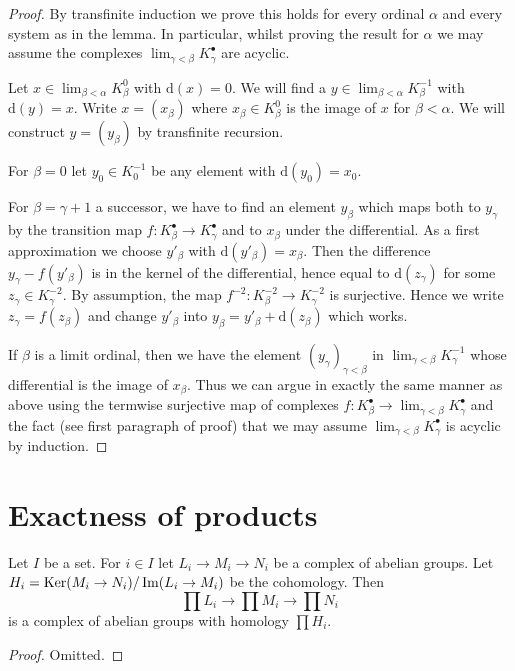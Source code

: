 \begin{proof}
By transfinite induction we prove this holds for every ordinal
$\alpha$ and every system as in the lemma. In particular, whilst
proving the result for $\alpha$ we may assume the complexes
$\lim_{\gamma < \beta} K^\bullet_\gamma$ are acyclic.

\medskip\noindent
Let $x \in \lim_{\beta < \alpha} K^0_\beta$ with $\text{d}(x) = 0$.
We will find a $y \in \lim_{\beta < \alpha} K^{-1}_\beta$
with $\text{d}(y) = x$.
Write $x = (x_\beta)$ where $x_\beta \in K_\beta^0$ is the
image of $x$ for $\beta < \alpha$. We will construct $y = (y_\beta)$
by transfinite recursion.

\medskip\noindent
For $\beta = 0$ let $y_0 \in K_0^{-1}$
be any element with $\text{d}(y_0) = x_0$.

\medskip\noindent
For $\beta = \gamma + 1$ a successor, we have to find an element $y_\beta$
which maps both to $y_\gamma$ by the transition map
$f : K^\bullet_\beta \to K^\bullet_\gamma$ and to $x_\beta$ under the
differential. As a first approximation we choose $y'_\beta$ with
$\text{d}(y'_\beta) = x_\beta$. Then the difference $y_\gamma - f(y'_\beta)$
is in the kernel of the differential, hence equal to $\text{d}(z_\gamma)$
for some $z_\gamma \in K^{-2}_\gamma$.
By assumption, the map $f^{-2} : K^{-2}_\beta \to K^{-2}_\gamma$
is surjective. Hence we write $z_\gamma = f(z_\beta)$
and change $y'_\beta$ into $y_\beta = y'_\beta + \text{d}(z_\beta)$
which works.

\medskip\noindent
If $\beta$ is a limit ordinal, then we have the element
$(y_\gamma)_{\gamma < \beta}$ in $\lim_{\gamma < \beta} K^{-1}_\gamma$
whose differential is the image of $x_\beta$. Thus we can argue in exactly
the same manner as above using the termwise surjective map of complexes
$f : K_\beta^\bullet \to \lim_{\gamma < \beta} K_\gamma^\bullet$
and the fact (see first paragraph of proof) that we may assume
$\lim_{\gamma < \beta} K_\gamma^\bullet$ is acyclic by induction.
\end{proof}


\section{Exactness of products}
\label{section-product-exact}


\begin{lemma}
\label{lemma-product-abelian-groups-exact}
Let $I$ be a set. For $i \in I$ let $L_i \to M_i \to N_i$ be a complex
of abelian groups. Let $H_i = \mathop{\mathrm{Ker}}(M_i \to N_i)/\mathop{\mathrm{Im}}(L_i \to M_i)$
be the cohomology. Then
$$
\prod L_i \to \prod M_i \to \prod N_i
$$
is a complex of abelian groups with homology $\prod H_i$.
\end{lemma}

\begin{proof}
Omitted.
\end{proof}












